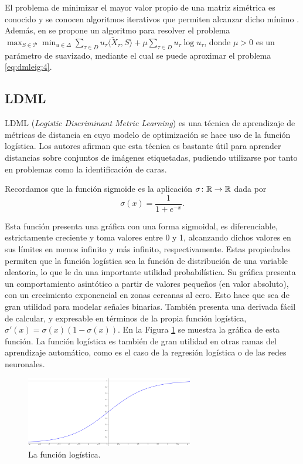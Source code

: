 El problema de minimizar el mayor valor propio de una matriz simétrica es conocido y se conocen algoritmos iterativos que permiten alcanzar dicho mínimo \cite{overton1988minimizing}. Además, en \cite{dmleig} se propone un algoritmo para resolver el problema $\max_{S \in \mathcal{P}} \min_{u \in \Delta} \sum_{\tau \in D} u_{\tau}\langle \widetilde{X}_{\tau},S\rangle + \mu \sum_{\tau \in D} u_{\tau} \log u_{\tau}$, donde $\mu > 0$ es un parámetro de suavizado, mediante el cual se puede aproximar el problema \ref{eq:dmleig:4}.





\subsection{LDML}

LDML (\emph{Logistic Discriminant Metric Learning}) \cite{ldml} es una técnica de aprendizaje de métricas de distancia en cuyo modelo de optimización se hace uso de la función logística. Los autores afirman que esta técnica es bastante útil para aprender distancias sobre conjuntos de imágenes etiquetadas, pudiendo utilizarse por tanto en problemas como la identificación de caras.

Recordamos que la función sigmoide es la aplicación $\sigma\colon \mathbb{R} \to \mathbb{R}$ dada por
\[ \sigma(x) = \frac{1}{1+e^{-x}}. \]

Esta función presenta una gráfica con una forma sigmoidal, es diferenciable, estrictamente creciente y toma valores entre 0 y 1, alcanzando dichos valores en sus límites en menos infinito y más infinito, respectivamente. Estas propiedades permiten que la función logística sea la función de distribución de una variable aleatoria, lo que le da una importante utilidad probabilística. Su gráfica presenta  un comportamiento asintótico a partir de valores pequeños (en valor absoluto), con un crecimiento exponencial en zonas cercanas al cero. Esto hace que sea de gran utilidad para modelar señales binarias. También presenta una derivada fácil de calcular, y expresable en términos de la propia función logística, $\sigma'(x) = \sigma(x)(1-\sigma(x))$. En la Figura \ref{fig:funcion_logistica} se muestra la gráfica de esta función. La función logística es también de gran utilidad en otras ramas del aprendizaje automático, como es el caso de la regresión logística o de las redes neuronales.

\begin{figure}[h]
    \centering
    \includegraphics[width=0.65\textwidth]{images/logistica.png}
    \caption{La función logística.} \label{fig:funcion_logistica}
\end{figure}

